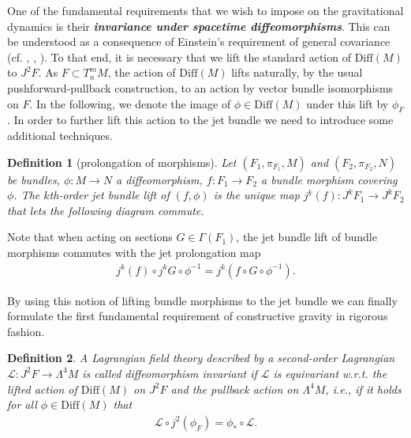 \documentclass[%
preprint,
nofootinbib,
amsmath,amssymb,
aps,
prd,
floatfix,
]{revtex4-2}
\newtheorem{definition}{Definition}
\begin{document}
One of the fundamental requirements that we wish to impose on the gravitational dynamics is their \textit{\textbf{invariance under spacetime diffeomorphisms}}. 
This can be understood as a consequence of Einstein's requirement of general covariance (cf. \cite{Stachel1993-STATMO-5}, \cite{Pooley}, \cite{Norton1993-NORGCA}).
To that end, it is necessary that we lift the standard action of $\mathrm{Diff}(M)$ to $J^2F$.
As $F\subset T^m_nM$, the action of $\mathrm{Diff}(M)$ lifts naturally, by the usual pushforward-pullback construction, to an action by vector bundle isomorphisms on $F$.
In the following, we denote the image of $\phi \in \mathrm{Diff}(M)$ under this lift by $\phi_F$.
In order to further lift this action to the jet bundle we need to introduce some additional techniques.
\begin{definition}[prolongation of morphisms]
Let $(F_1,\pi_{F_1},M)$ and $(F_2,\pi_{F_2},N)$ be bundles, $\phi : M \rightarrow N$ a diffeomorphism, $f : F_1 \rightarrow F_2$ a bundle morphism covering $\phi$. The $k$th-order jet bundle lift of $(f,\phi)$ is the unique  map $j^k(f):J^kF_1 \rightarrow J^kF_2$ that lets the following diagram commute.
\begin{center}
\end{center}
\end{definition}
Note that when acting on sections $G \in \Gamma(F_1)$, the jet bundle lift of bundle morphisms commutes with the jet prolongation map
\begin{align}
j^k(f) \circ j^kG \circ \phi^{-1} = j^k \left (
f \circ G \circ \phi^{-1} \right ).
\end{align}

By using this notion of lifting bundle morphisms to the jet bundle we can finally formulate the first fundamental requirement of constructive gravity in rigorous fashion. 
\begin{definition}
A Lagrangian field theory described by a second-order Lagrangian $\mathcal{L} : J^2F \rightarrow \Lambda^4 M$ is called diffeomorphism invariant if $\mathcal{L}$ is equivariant w.r.t. the lifted action of $\mathrm{Diff}(M)$ on $J^2F$ and the pullback action on $\Lambda^4M$, i.e., if it holds for all $\phi \in \mathrm{Diff}(M)$ that 
\begin{align}\label{DiffeoReq}\tag{Axiom 1}
     \mathcal{L}\circ j^2(\phi_F) = \phi_{\ast} \circ \mathcal{L}.
\end{align}
\end{definition}
\end{document}
